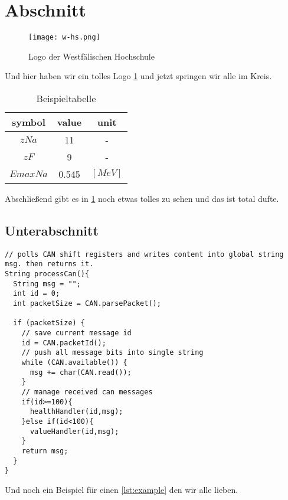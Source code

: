 \section{Abschnitt}\label{sec:first}

\begin{figure}[!ht]
    \centering
    \texttt{[image: w-hs.png]}
    \captionsetup{width=1.0\linewidth}
    \caption[Logo der Westfälischen Hochschule]{Logo der Westfälischen Hochschule \parencite{whs}}
    \label{fig:w-hs} %
\end{figure}

\noindent Und hier haben wir ein tolles Logo \cref{fig:w-hs} und jetzt springen wir alle im Kreis.

\begin{table}[!ht]
\centering
    \begin{tabular}{ | c | c | c | }
        \hline
        symbol & value & unit \\ \hline            
        $z Na$ & 11 & - \\ \hline      
        $z F$ & 9 & - \\ \hline      
        $Emax Na$ & 0.545 & $[MeV]$ \\ \hline
    \end{tabular}
    \caption{Beispieltabelle}
    \label{tab:example} %
\end{table}

\noindent Abschließend gibt es in \cref{tab:example} noch etwas tolles zu sehen und das ist total dufte.

\subsection{Unterabschnitt}\label{subsec:first}

\begin{lstlisting}[caption = C++ Quellcodebeispiel, captionpos = b, label = lst:example]
// polls CAN shift registers and writes content into global string msg. then returns it.
String processCan(){                
  String msg = "";
  int id = 0;
  int packetSize = CAN.parsePacket();

  if (packetSize) {
    // save current message id
    id = CAN.packetId(); 
    // push all message bits into single string
    while (CAN.available()) {       
      msg += char(CAN.read());
    }
    // manage received can messages
    if(id>=100){                    
      healthHandler(id,msg);
    }else if(id<100){
      valueHandler(id,msg);
    } 
    return msg;
  }
}
\end{lstlisting}
Und noch ein Beispiel für einen \cref{lst:example} den wir alle lieben.

